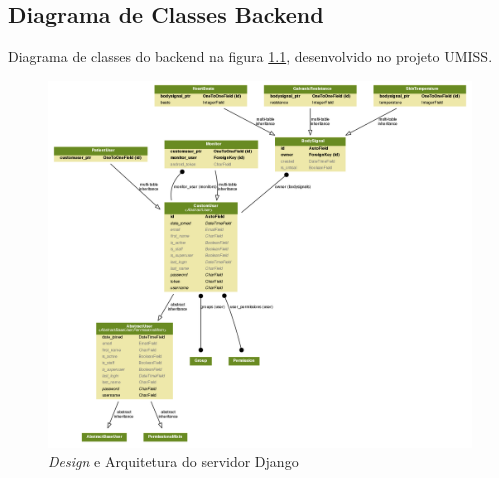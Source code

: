 \begin{anexosenv}

    \partanexos

    \chapter{Diagrama de Classes Backend}
    \label{anx:server_uml}
    Diagrama de classes do backend na figura \ref{fig:server_uml}, desenvolvido no projeto UMISS.

    \begin{figure}
        \begin{center}
            \includegraphics[scale=0.5,angle=90]{figuras/server_uml.png}
        \end{center}
        \caption{\textit{Design} e Arquitetura do servidor Django}
        \label{fig:server_uml}
    \end{figure}

\end{anexosenv}

